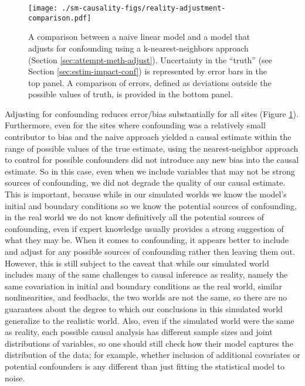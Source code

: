 \begin{figure}
  \texttt{[image: ./sm-causality-figs/reality-adjustment-comparison.pdf]}
  \caption{A comparison between a naive linear model and a model that
    adjusts for confounding using a k-nearest-neighbors approach
    (Section \ref{sec:attempt-meth-adjust}). Uncertainty in the
    ``truth'' (see Section \ref{sec:estim-impact-conf}) is represented
    by error bars in the top panel. A comparison of errors, defined as
    deviations outside the possible values of truth, is provided in
    the bottom panel.  }
\label{fig:reality-adjustment}
\end{figure}

Adjusting for confounding reduces error/bias substantially for all
sites (Figure \ref{fig:reality-adjustment}). Furthermore, even for the
sites where confounding was a relatively small contributor to bias and
the naive approach yielded a causal estimate within the range of
possible values of the true estimate, using the nearest-neighbor
approach to control for possible confounders did not introduce any new
bias into the causal estimate. So in this case, even when we include
variables that may not be strong sources of confounding, we did not
degrade the quality of our causal estimate. This is important, because
while in our simulated worlds we know the model's initial and boundary
conditions so we know the potential sources of confounding, in the
real world we do not know definitively all the potential sources of
confounding, even if expert knowledge usually provides a strong
suggestion of what they may be. When it comes to confounding, it
appears better to include and adjust for any possible sources of
confounding rather then leaving them out. However, this is still
subject to the caveat that while our simulated world includes many of
the same challenges to causal inference as reality, namely the same
covariation in initial and boundary conditions as the real world,
similar nonlinearities, and feedbacks, the two worlds are not the
same, so there are no guarantees about the degree to which our
conclusions in this simulated world generalize to the realistic
world. Also, even if the simulated world were the same as reality,
each possible causal analysis has different sample sizes and joint
distributions of variables, so one should still check how their model
captures the distribution of the data; for example, whether inclusion
of additional covariates or potential confounders is any different
than just fitting the statistical model to noise.


